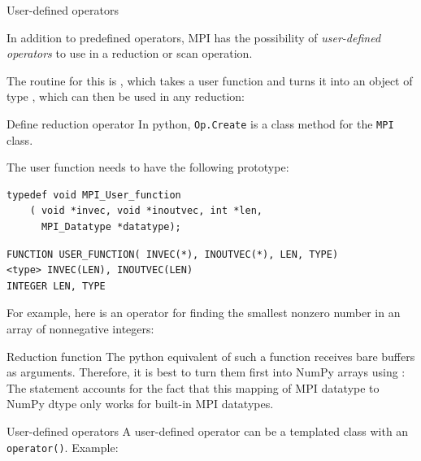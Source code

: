  {User-defined operators}
\label{sec:mpi-op-create}

In addition to predefined operators, MPI has the possibility of
\emph{user-defined operators}
to use in a reduction or scan operation.

The routine for this is ,
which takes a user function and turns it into
an object of type , which can then be
used in any reduction:
%

\begin{pythonnote}{Define reduction operator}
  In python, \lstinline+Op.Create+ is a class method for the \lstinline+MPI+ class.
\end{pythonnote}

The user function needs to have the following prototype:

\lstset{language=C}
\begin{lstlisting}
typedef void MPI_User_function
    ( void *invec, void *inoutvec, int *len, 
      MPI_Datatype *datatype); 
\end{lstlisting}

\lstset{language=Fortran}
\begin{lstlisting}
FUNCTION USER_FUNCTION( INVEC(*), INOUTVEC(*), LEN, TYPE) 
<type> INVEC(LEN), INOUTVEC(LEN) 
INTEGER LEN, TYPE 
\end{lstlisting}
\lstset{language=C}

For example, here is an operator for finding the smallest nonzero
number in an array of nonnegative integers:
%

\begin{pythonnote}{Reduction function}
  The python equivalent of such a function receives bare buffers as
  arguments. Therefore, it is best to turn them first into NumPy arrays
  using :
  The  statement accounts for the fact that this mapping of
  MPI datatype to NumPy dtype only works for built-in MPI datatypes.
\end{pythonnote}

\begin{mplnote}{User-defined operators}
  A user-defined operator can be a templated class with an \lstinline+operator()+.
  Example:
\end{mplnote}

